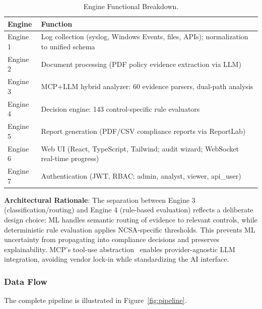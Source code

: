 \documentclass[futureinternet,article,submit,pdftex,moreauthors]{Definitions/mdpi}
\begin{document}
\begin{table}[H]
\caption{Engine Functional Breakdown.\label{tab:engines}}
\begin{tabularx}{\textwidth}{lX}
\toprule
\textbf{Engine} & \textbf{Function} \\
\midrule
Engine 1 & Log collection (syslog, Windows Events, files, APIs); normalization to unified schema \\
Engine 2 & Document processing (PDF policy evidence extraction via LLM) \\
Engine 3 & MCP+LLM hybrid analyzer: 60 evidence parsers, dual-path analysis \\
Engine 4 & Decision engine: 143 control-specific rule evaluators \\
Engine 5 & Report generation (PDF/CSV compliance reports via ReportLab) \\
Engine 6 & Web UI (React, TypeScript, Tailwind; audit wizard; WebSocket real-time progress) \\
Engine 7 & Authentication (JWT, RBAC: admin, analyst, viewer, api\_user) \\
\bottomrule
\end{tabularx}
\end{table}

\textbf{Architectural Rationale}: The separation between Engine 3 (classification/routing) and
Engine 4 (rule-based evaluation) reflects a deliberate design choice: ML handles semantic
routing of evidence to relevant controls, while deterministic rule evaluation applies
NCSA-specific thresholds. This prevents ML uncertainty from propagating into compliance
decisions and preserves explainability. MCP's tool-use abstraction~\cite{mcp_enterprise}
enables provider-agnostic LLM integration, avoiding vendor lock-in while standardizing the
AI interface.

\subsubsection{Data Flow}

The complete pipeline is illustrated in Figure~\ref{fig:pipeline}.
\end{document}
